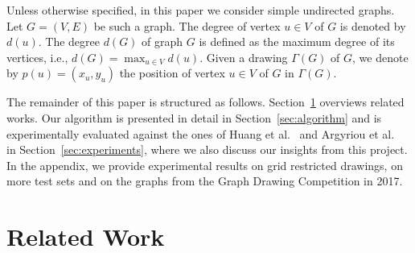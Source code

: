 \documentclass[runningheads]{llncs}
\begin{document}
\medskip{}
Unless otherwise specified, in this paper we consider simple undirected graphs. Let $G=(V,E)$ be such a graph. The degree of vertex $u\in V$ of $G$ is denoted by $d(u)$. The degree $d(G)$ of  graph $G$ is defined as the maximum degree of its vertices, i.e., $d(G)=\max_{u\in V}d(u)$.
%
Given a drawing $\Gamma(G)$ of $G$, we denote by $p(u)=(x_u,y_u)$ the position of vertex $u \in V$ of $G$ in $\Gamma(G)$. %

\medskip{}
The remainder of this paper is structured as follows. Section~\ref{sec:relatedwork} overviews related works.
Our algorithm is presented in detail in Section~\ref{sec:algorithm} and is experimentally evaluated against the ones of Huang et al.~\cite{DBLP:journals/vlc/HuangEHL13} and Argyriou et al.~\cite{DBLP:journals/cj/ArgyriouBS13} in Section~\ref{sec:experiments}, where we also discuss our insights from this project. In the appendix, we provide experimental results on grid restricted drawings, on more test sets and on the graphs from the Graph Drawing Competition in 2017.

\section{Related Work}
\label{sec:relatedwork}
\end{document}
